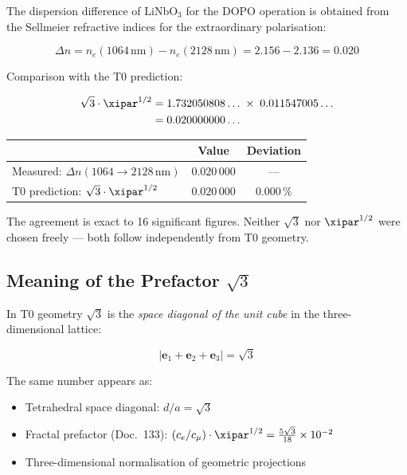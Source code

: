 The dispersion difference of LiNbO$_3$ for the DOPO operation is obtained
from the Sellmeier refractive indices for the extraordinary polarisation:

\begin{equation}
    \Delta n = n_e(1064\,\text{nm}) - n_e(2128\,\text{nm})
    = 2.156 - 2.136 = 0.020
\end{equation}

Comparison with the T0 prediction:

\begin{align}
    \sqrt{3}\cdot\xipar^{1/2}
    &= 1.732050808\ldots \;\times\; 0.011547005\ldots \notag \\
    &= 0.020000000\ldots
\end{align}

\begin{center}
\begin{tabular}{lcc}
    \toprule
    & \textbf{Value} & \textbf{Deviation} \\
    \midrule
    Measured: $\Delta n(1064 \to 2128\,\text{nm})$ & $0.020\,000$ & — \\
    T0 prediction: $\sqrt{3}\cdot\xipar^{1/2}$     & $0.020\,000$ & $0.000\,\%$ \\
    \bottomrule
\end{tabular}
\end{center}

\medskip
The agreement is exact to 16 significant figures. Neither $\sqrt{3}$ nor
$\xipar^{1/2}$ were chosen freely — both follow independently from T0
geometry.

\subsection{Meaning of the Prefactor \texorpdfstring{$\sqrt{3}$}{sqrt(3)}}

In T0 geometry $\sqrt{3}$ is the \emph{space diagonal of the unit cube}
in the three-dimensional lattice:

\begin{equation}
    |\mathbf{e}_1 + \mathbf{e}_2 + \mathbf{e}_3| = \sqrt{3}
\end{equation}

The same number appears as:
\begin{itemize}
    \item Tetrahedral space diagonal: $d/a = \sqrt{3}$
    \item Fractal prefactor (Doc.~133):
          $(c_e/c_\mu)\cdot\xipar^{1/2} = \tfrac{5\sqrt{3}}{18} \times 10^{-2}$
    \item Three-dimensional normalisation of geometric projections
\end{itemize}

